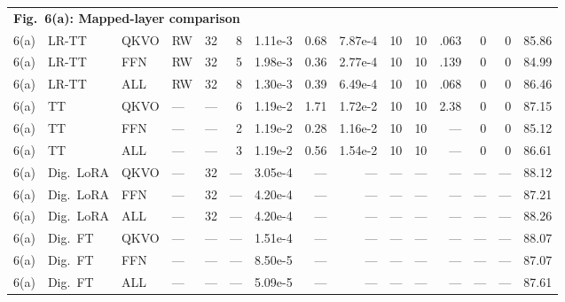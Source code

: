 \documentclass[fleqn,10pt]{wlscirep}
\begin{document}
{\begin{longtable}{@{}l l l l r r r r r r r r r r r@{}}
\multicolumn{15}{l}{\cellcolor{HeadGray}\textbf{Fig.~6(a): Mapped-layer comparison}} \\
6(a) & LR-TT & QKVO & RW & 32 & 8 & 1.11e-3 & 0.68 & 7.87e-4 & 10 & 10 & .063 & 0 & 0 & 85.86 \\
6(a) & LR-TT & FFN & RW & 32 & 5 & 1.98e-3 & 0.36 & 2.77e-4 & 10 & 10 & .139 & 0 & 0 & 84.99 \\
6(a) & LR-TT & ALL & RW & 32 & 8 & 1.30e-3 & 0.39 & 6.49e-4 & 10 & 10 & .068 & 0 & 0 & 86.46 \\
6(a) & TT & QKVO & --- & --- & 6 & 1.19e-2 & 1.71 & 1.72e-2 & 10 & 10 & 2.38 & 0 & 0 & 87.15 \\
6(a) & TT & FFN & --- & --- & 2 & 1.19e-2 & 0.28 & 1.16e-2 & 10 & 10 & --- & 0 & 0 & 85.12 \\
6(a) & TT & ALL & --- & --- & 3 & 1.19e-2 & 0.56 & 1.54e-2 & 10 & 10 & --- & 0 & 0 & 86.61 \\
6(a) & Dig.\ LoRA & QKVO & --- & 32 & --- & 3.05e-4 & --- & --- & --- & --- & --- & --- & --- & 88.12 \\
6(a) & Dig.\ LoRA & FFN & --- & 32 & --- & 4.20e-4 & --- & --- & --- & --- & --- & --- & --- & 87.21 \\
6(a) & Dig.\ LoRA & ALL & --- & 32 & --- & 4.20e-4 & --- & --- & --- & --- & --- & --- & --- & 88.26 \\
6(a) & Dig.\ FT & QKVO & --- & --- & --- & 1.51e-4 & --- & --- & --- & --- & --- & --- & --- & 88.07 \\
6(a) & Dig.\ FT & FFN & --- & --- & --- & 8.50e-5 & --- & --- & --- & --- & --- & --- & --- & 87.07 \\
6(a) & Dig.\ FT & ALL & --- & --- & --- & 5.09e-5 & --- & --- & --- & --- & --- & --- & --- & 87.61 \\
\midrule


\end{longtable}}
\end{document}

